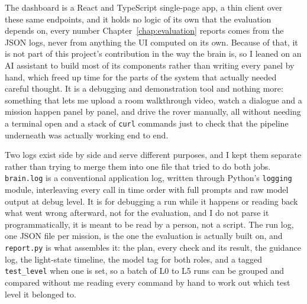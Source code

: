 The dashboard is a React and TypeScript single-page app, a thin client over
these same endpoints, and it holds no logic of its own that the evaluation
depends on, every number Chapter~\ref{chap:evaluation} reports comes from
the JSON logs, never from anything the UI computed on its own. Because of
that, it is not part of this project's contribution in the way the brain
is, so I leaned on an AI assistant to build most of its components rather
than writing every panel by hand, which freed up time for the parts of the
system that actually needed careful thought. It is a debugging and
demonstration tool and nothing more: something that lets me upload a room
walkthrough video, watch a dialogue and a mission happen panel by panel,
and drive the rover manually, all without needing a terminal open and a
stack of \texttt{curl} commands just to check that the pipeline underneath
was actually working end to end.

\label{sec:logging}

Two logs exist side by side and serve different purposes, and I kept them
separate rather than trying to merge them into one file that tried to do
both jobs. \texttt{brain.log} is a conventional application log, written
through Python's \texttt{logging} module, interleaving every call in time
order with full prompts and raw model output at debug level. It is for
debugging a run while it happens or reading back what went wrong afterward,
not for the evaluation, and I do not parse it programmatically, it is meant
to be read by a person, not a script. The run log, one JSON file per
mission, is the one the evaluation is actually built on, and
\texttt{report.py} is what assembles it: the plan, every check and its
result, the guidance log, the light-state timeline, the model tag for both
roles, and a tagged \texttt{test\_level} when one is set, so a batch of L0
to L5 runs can be grouped and compared without me reading every command by
hand to work out which test level it belonged to.

